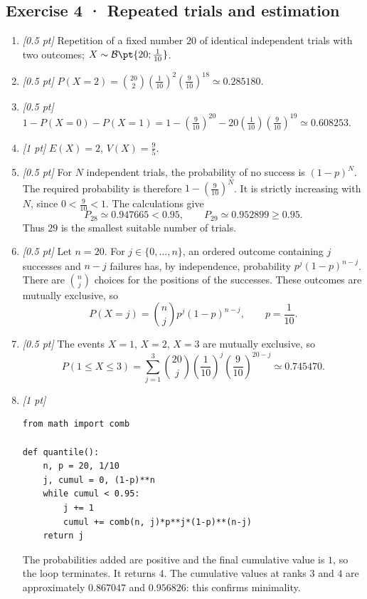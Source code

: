 \subsection*{Exercise 4 · Repeated trials and estimation}\begin{enumerate}

\item \textit{[0.5 pt]} Repetition of a fixed number $20$ of identical independent trials with two outcomes; $X\sim\mathcal B\pt{20;\frac{1}{10}}$.

\item \textit{[0.5 pt]} $P(X=2)=\binom{20}2(\frac{1}{10})^2(\frac{9}{10})^{18}\simeq\num{0,285180}$.

\item \textit{[0.5 pt]} $1-P(X=0)-P(X=1)=1-(\frac{9}{10})^{20}-20(\frac{1}{10})(\frac{9}{10})^{19}\simeq\num{0,608253}$.

\item \textit{[1 pt]} $E(X)=2$, $V(X)=\frac{9}{5}$.

\item \textit{[0.5 pt]} For $N$ independent trials, the probability of no success is $(1-p)^N$. The required probability is therefore $1-(\frac{9}{10})^N$. It is strictly increasing with $N$, since $0<\frac{9}{10}<1$. The calculations give
\[P_{28}\simeq\num{0,947665}<\num{0,95},\qquad P_{29}\simeq\num{0,952899}\ge\num{0,95}.\]
Thus $29$ is the smallest suitable number of trials.

\item \textit{[0.5 pt]} Let $n=20$. For $j\in\{0,\ldots,n\}$, an ordered outcome containing $j$ successes and $n-j$ failures has, by independence, probability $p^j(1-p)^{n-j}$. There are $\binom nj$ choices for the positions of the successes. These outcomes are mutually exclusive, so
\[P(X=j)=\binom nj p^j(1-p)^{n-j},\qquad p=\frac{1}{10}.\]

\item \textit{[0.5 pt]} The events $X=1$, $X=2$, $X=3$ are mutually exclusive, so
\[P(1\le X\le3)=\sum_{j=1}^3\binom{20}j(\frac{1}{10})^j(\frac{9}{10})^{20-j}\simeq\num{0,745470}.\]


\item \textit{[1 pt]} 
\begin{lstlisting}
from math import comb

def quantile():
    n, p = 20, 1/10
    j, cumul = 0, (1-p)**n
    while cumul < 0.95:
        j += 1
        cumul += comb(n, j)*p**j*(1-p)**(n-j)
    return j
\end{lstlisting}
The probabilities added are positive and the final cumulative value is $1$, so the loop terminates. It returns $4$. The cumulative values at ranks $3$ and $4$ are approximately $\num{0,867047}$ and $\num{0,956826}$: this confirms minimality.

\end{enumerate}

\fi

\fi

